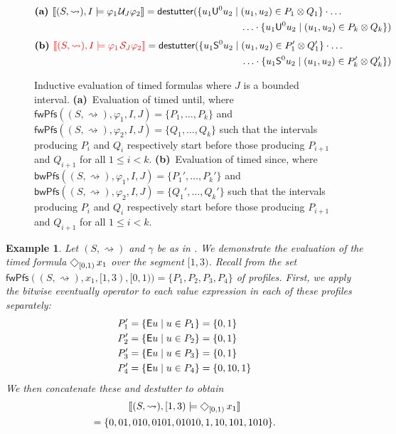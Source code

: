 \documentclass[iicol,lineno]{sn-jnl}
\renewcommand{\cref}{\Cref}
\newcommand{\hb}{\rightsquigarrow}
\newcommand{\destutter}{\mathsf{destutter}}
\renewcommand{\LTLf}{\LTLdiamond}
\let\LTLeventually\LTLf
\def\until{\kern.1em\mathcal{U}}
\def\since{\kern.1em\mathcal{S}}
\newcommand{\?}{\text{?}}
\newcommand{\suchthat}{\;\ifnum\currentgrouptype=16 \middle\fi|\;}
\let\st\suchthat
\newtheorem{example}{Example}
\begin{document}
	\begin{figure}[!t]
		\begin{align*}
			\textbf{(a) }
			\llbracket (S, {\hb}), I \models \varphi_1 \until_J \varphi_2 \rrbracket = \destutter( \{ u_1 \mathsf{U}^0 u_2 \st &(u_1, u_2) \in P_1 \otimes Q_1 \} \cdot \ldots \\ 
			&\ldots \cdot \{ u_1 \mathsf{U}^0 u_2 \st (u_1, u_2) \in P_k \otimes Q_k \} )
		\end{align*}
		\begin{align*}
			\textbf{(b) }
			\bgroup \color{red} \llbracket (S, {\hb}), I \models \varphi_1 \since_J \varphi_2 \rrbracket \egroup = \destutter( \{ u_1 \mathsf{S}^0 u_2 \st &(u_1, u_2) \in P_1' \otimes Q_1' \} \cdot \ldots \\ 
			&\ldots \cdot \{ u_1 \mathsf{S}^0 u_2 \st (u_1, u_2) \in P_k' \otimes Q_k' \} )
		\end{align*}
		\caption{Inductive evaluation of timed formulas where $J$ is a bounded interval.
			\textbf{(a)}~Evaluation of timed until, where $\mathsf{fwPfs}((S,{\hb}), \varphi_1, I, J) = \{P_1, \ldots, P_k \}$ and $\mathsf{fwPfs}((S,{\hb}), \varphi_2, I, J) = \{Q_1, \ldots, Q_k \}$ such that the intervals producing $P_i$ and $Q_i$ respectively start before those producing $P_{i+1}$ and $Q_{i+1}$ for all $1 \leq i < k$.
			\textbf{(b)}~Evaluation of timed since, where $\mathsf{bwPfs}((S,{\hb}), \varphi_1, I, J) = \{P_1', \ldots, P_k' \}$ and $\mathsf{bwPfs}((S,{\hb}), \varphi_2, I, J) = \{Q_1', \ldots, Q_k' \}$ such that the intervals producing $P_i$ and $Q_i$ respectively start before those producing $P_{i+1}$ and $Q_{i+1}$ for all $1 \leq i < k$.
			\label{fig:timedEval}}
	\end{figure}
	
	\begin{example} \label{ex:timed}
		Let $(S, {\hb})$ and $\gamma$ be as in \cref{fig:csve}.
		We demonstrate the evaluation of the timed formula $\LTLeventually_{[0,1)} x_1$ over the segment $[1,3)$.
		Recall from \cref{ex:profiles} the set $\mathsf{fwPfs}((S,{\hb}), x_1, [1,3), [0,1)) = \{P_1, P_2, P_3, P_4\}$ of profiles.
		First, we apply the bitwise eventually operator to each value expression in each of these profiles separately:
		\begin{align*}
			P_1' &= \{ \mathsf{E} u \st u \in P_1 \} = \{ 0, 1 \} \\
			P_2' &= \{ \mathsf{E} u \st u \in P_2 \} = \{ 0, 1 \} \\
			P_3' &= \{ \mathsf{E} u \st u \in P_3 \} = \{ 0, 1 \} \\
			P_4' &= \{ \mathsf{E} u \st u \in P_4 \} = \{ 0, 10, 1 \} \\
		\end{align*}
		We then concatenate these and destutter to obtain 
		\begin{multline*}
			\llbracket (S, {\hb}), [1,3) \models \LTLeventually_{[0,1)} x_1 \rrbracket \\= \{ 0, 01, 010, 0101, 01010, 1, 10, 101, 1010 \}. 
		\end{multline*}
	\end{example}
	
\end{document}
